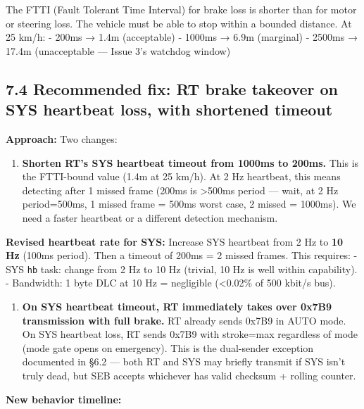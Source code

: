 \documentclass[12pt,a4paper,oneside]{report}
\providecommand{\tightlist}{\setlength{\itemsep}{0pt}\setlength{\parskip}{0pt}}
\begin{document}
The FTTI (Fault Tolerant Time Interval) for brake loss is shorter than for motor
or steering loss. The vehicle must be able to stop within a bounded distance. At
25 km/h: - 200ms → 1.4m (acceptable) - 1000ms → 6.9m (marginal) - 2500ms → 17.4m
(unacceptable --- Issue 3's watchdog window)

\subsection{7.4 Recommended fix: RT brake takeover on SYS heartbeat loss, with
shortened
timeout}\label{recommended-fix-rt-brake-takeover-on-sys-heartbeat-loss-with-shortened-timeout}

\textbf{Approach:} Two changes:

\begin{enumerate}
\def\labelenumi{\arabic{enumi}.}
\tightlist
\item
  \textbf{Shorten RT's SYS heartbeat timeout from 1000ms to 200ms.} This is the
  FTTI-bound value (1.4m at 25 km/h). At 2 Hz heartbeat, this means detecting
  after 1 missed frame (200ms is \textgreater500ms period --- wait, at 2 Hz
  period=500ms, 1 missed frame = 500ms worst case, 2 missed = 1000ms). We need a
  faster heartbeat or a different detection mechanism.
\end{enumerate}

\textbf{Revised heartbeat rate for SYS:} Increase SYS heartbeat from 2 Hz to
\textbf{10 Hz} (100ms period). Then a timeout of 200ms = 2 missed frames. This
requires: - SYS \texttt{hb} task: change from 2 Hz to 10 Hz (trivial, 10 Hz is
well within capability). - Bandwidth: 1 byte DLC at 10 Hz = negligible
(\textless0.02\% of 500 kbit/s bus).

\begin{enumerate}
\def\labelenumi{\arabic{enumi}.}
\setcounter{enumi}{1}
\tightlist
\item
  \textbf{On SYS heartbeat timeout, RT immediately takes over 0x7B9 transmission
  with full brake.} RT already sends 0x7B9 in AUTO mode. On SYS heartbeat loss,
  RT sends 0x7B9 with stroke=max regardless of mode (mode gate opens on
  emergency). This is the dual-sender exception documented in §6.2 --- both RT
  and SYS may briefly transmit if SYS isn't truly dead, but SEB accepts
  whichever has valid checksum + rolling counter.
\end{enumerate}

\textbf{New behavior timeline:}
\end{document}
